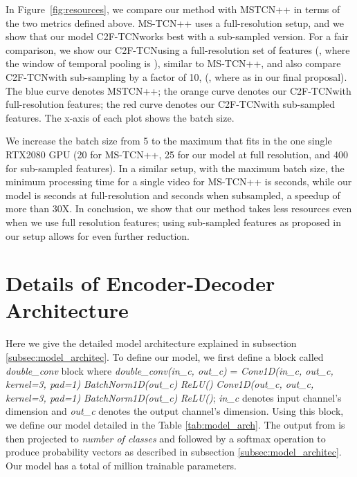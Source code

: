 \documentclass[10pt,twocolumn,letterpaper]{article}
\newcommand{\modelname}{C2F-TCN}
\begin{document}
In Figure~\ref{fig:resources}, we compare our method with MSTCN++ in terms of the two metrics defined above. MS-TCN++ uses a full-resolution setup, and we show that our model \modelname works best with a sub-sampled version. For a fair comparison, we show our \modelname using a full-resolution set of features (\ie, where the window of temporal pooling is ), similar to MS-TCN++, and also compare \modelname with sub-sampling by a factor of 10, (\ie, where  as in our final proposal). The blue curve denotes MSTCN++; the orange curve denotes our \modelname with full-resolution features; the red curve denotes our \modelname with sub-sampled features. The x-axis of each plot shows the batch size. 

We increase the batch size from 5 to the maximum that fits in the one single RTX2080 GPU (20 for MS-TCN++, 25 for our model at full resolution, and 400 for sub-sampled features).  In a similar setup, with the maximum batch size, the minimum processing time for a single video for MS-TCN++ is  seconds, while our model is  seconds at full-resolution and  seconds when subsampled, \ie a speedup of more than 30X. In conclusion, we show that our method takes less resources even when we use full resolution features; using sub-sampled features as proposed in our setup allows for even further reduction.  

\section{Details of Encoder-Decoder Architecture}

Here we give the detailed model architecture explained in subsection \ref{subsec:model_architec}. To define our model, we first define a block called \textit{double\_conv} block where \textit{double\_conv(in\_c, out\_c)} = \textit{Conv1D(in\_c, out\_c, kernel=3, pad=1)}  \textit{BatchNorm1D(out\_c)}  \textit{ReLU()}  \textit{Conv1D(out\_c, out\_c, kernel=3, pad=1)}  \textit{BatchNorm1D(out\_c)}  \textit{ReLU()}; \textit{in\_c} denotes input channel's dimension and \textit{out\_c} denotes the output channel's dimension. Using this block, we define our model  detailed in the Table \ref{tab:model_arch}. The output from  is then projected to \textit{number of classes} and followed by a softmax operation to produce probability vectors  as described in subsection \ref{subsec:model_architec}. Our model has a total of  million trainable parameters.
\end{document}
